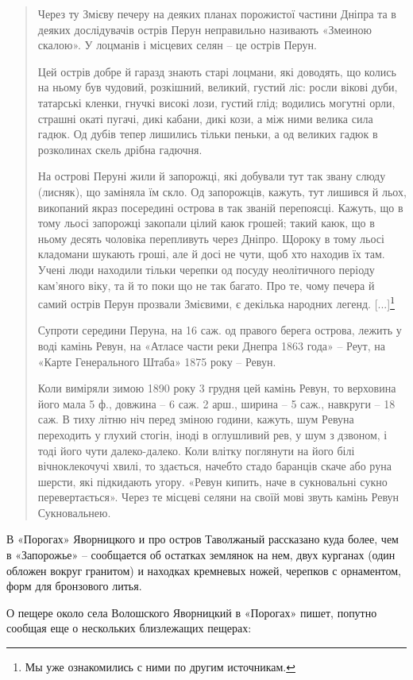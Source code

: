\begin{quotation}
Через ту Змієву печеру на деяких планах порожистої частини Дніпра та в деяких дослідувачів острів Перун неправильно називають «Змеиною скалою». У лоцманів і місцевих селян – це острів Перун.

Цей острів добре й гаразд знають старі лоцмани, які доводять, що колись на ньому був чудовий, розкішний, великий, густий ліс: росли вікові дуби, татарські кленки, гнучкі високі лози, густий глід; водились могутні орли, страшні окаті пугачі, дикі кабани, дикі кози, а між ними велика сила гадюк. Од дубів тепер лишились тільки пеньки, а од великих гадюк в розколинах скель дрібна гадючня.

На острові Перуні жили й запорожці, які добували тут так звану слюду (лисняк), що заміняла їм скло. Од запорожців, кажуть, тут лишився й льох, викопаний якраз посередині острова в так званій перепоясці. Кажуть, що в тому льосі запорожці закопали цілий каюк грошей; такий каюк, що в ньому десять чоловіка перепливуть через Дніпро. Щороку в тому льосі кладомани шукають гроші, але й досі не чути, щоб хто находив їх там. Учені люди находили тільки черепки од посуду неолітичного періоду кам'яного віку, та й то поки що не так багато. Про те, чому печера й самий острів Перун прозвали Змієвими, є декілька народних легенд. [...]\footnote{Мы уже ознакомились с ними по другим источникам.}

Супроти середини Перуна, на 16 саж. од правого берега острова, лежить у воді камінь Ревун, на «Атласе части реки Днепра 1863 года» – Реут, на «Карте Генерального Штаба» 1875 року – Ревун.

Коли виміряли зимою 1890 року 3 грудня цей камінь Ревун, то верховина його мала 5 ф., довжина – 6 саж. 2 арш., ширина – 5 саж., навкруги – 18 саж. В тиху літню ніч перед зміною години, кажуть, шум Ревуна переходить у глухий стогін, іноді в оглушливий рев, у шум з дзвоном, і тоді його чути далеко-далеко. Коли влітку поглянути на його білі вічноклекочучі хвилі, то здається, начебто стадо баранців скаче або руна шерсти, які підкидають угору. «Ревун кипить, наче в сукновальні сукно перевертається». Через те місцеві селяни на своїй мові звуть камінь Ревун Сукновальнею.
\end{quotation}

В «Порогах» Яворницкого и про остров Таволжаный рассказано куда более, чем в «Запорожье» – сообщается об остатках землянок на нем, двух курганах (один обложен вокруг гранитом) и находках кремневых ножей, черепков с орнаментом, форм для бронзового литья.

О пещере около села Волошского Яворницкий в «Порогах» пишет, попутно сообщая еще о нескольких близлежащих пещерах:

